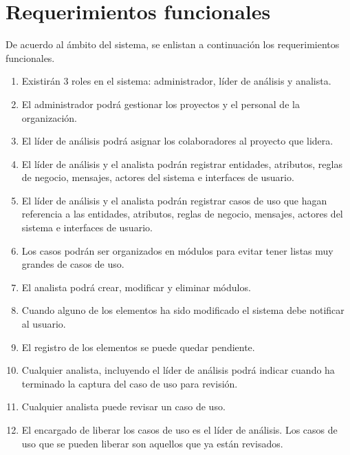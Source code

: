 \section{Requerimientos funcionales}
De acuerdo al ámbito del sistema, se enlistan a continuación los requerimientos funcionales.
\begin{enumerate}[{\bf RF01.}]
 \item Existirán 3 roles en el sistema: administrador, líder de análisis y analista.
 \item El administrador podrá gestionar los proyectos y el personal de la organización.
 \item El líder de análisis podrá asignar los colaboradores al proyecto que lidera.
 \item El líder de análisis y el analista podrán registrar entidades, atributos, reglas de negocio, mensajes, actores del sistema e interfaces de usuario.
 \item El líder de análisis y el analista podrán registrar casos de uso que hagan referencia a las entidades, atributos, reglas de negocio, mensajes, actores del sistema e interfaces de usuario.
 \item Los casos podrán ser organizados en módulos para evitar tener listas muy grandes de casos de uso.
 \item El analista podrá crear, modificar y eliminar módulos.
 \item Cuando alguno de los elementos ha sido modificado el sistema debe notificar al usuario.
 \item El registro de los elementos se puede quedar pendiente.
 \item Cualquier analista, incluyendo el líder de análisis podrá indicar cuando ha terminado la captura del caso de uso para revisión.
 \item Cualquier analista puede revisar un caso de uso.
 \item El encargado de liberar los casos de uso es el líder de análisis. Los casos de uso que se pueden liberar son aquellos que ya están revisados.
 

\end{enumerate}
